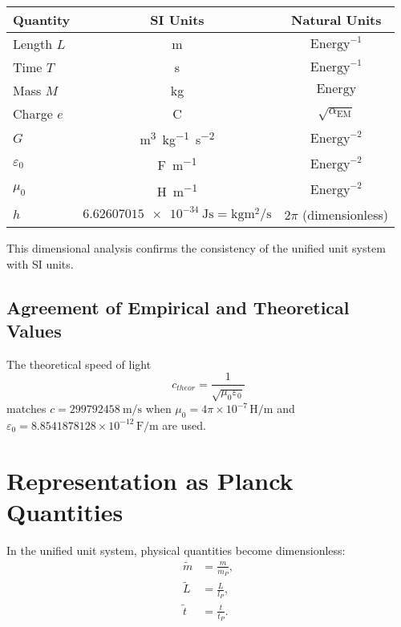 \documentclass[12pt,a4paper]{article}
\newcommand{\alphaEM}{\alpha_{\text{EM}}}
\begin{document}
	\begin{center}
		\begin{tabular}{lcc}
			\toprule
			\textbf{Quantity} & \textbf{SI Units} & \textbf{Natural Units} \\
			\midrule
			Length \(L\) & \si{\meter} & \(\text{Energy}^{-1}\) \\
			Time \(T\) & \si{\second} & \(\text{Energy}^{-1}\) \\
			Mass \(M\) & \si{\kilo\gram} & \(\text{Energy}\) \\
			Charge \(e\) & \si{\coulomb} & \(\sqrt{\alphaEM}\) \\
			\(G\) & \si{\meter^3\kilo\gram^{-1}\second^{-2}} & \(\text{Energy}^{-2}\) \\
			\(\varepsilon_0\) & \si{\farad\per\meter} & \(\text{Energy}^{-2}\) \\
			\(\mu_0\) & \si{\henry\per\meter} & \(\text{Energy}^{-2}\) \\
			\(h\) & \(\SI{6.62607015e-34}{\joule\second} = \si{\kilo\gram \meter\squared\per\second}\) & \(2\pi\) (dimensionless) \\
			\bottomrule
		\end{tabular}
	\end{center}
	
	This dimensional analysis confirms the consistency of the unified unit system with SI units.
	
	\subsection{Agreement of Empirical and Theoretical Values}
	
	The theoretical speed of light
	\begin{equation}
		c_{theor} = \frac{1}{\sqrt{\mu_0 \varepsilon_0}}
	\end{equation}
	matches \(c = \SI{299792458}{\meter\per\second}\) when \(\mu_0 = 4\pi \times 10^{-7} \, \si{\henry\per\meter}\) and \(\varepsilon_0 = 8.8541878128 \times 10^{-12} \, \si{\farad\per\meter}\) are used.
	
	\section{Representation as Planck Quantities}
	
	In the unified unit system, physical quantities become dimensionless:
	\begin{align}
		\tilde{m} &= \frac{m}{m_P}, \\
		\tilde{L} &= \frac{L}{l_P}, \\
		\tilde{t} &= \frac{t}{t_P}.
	\end{align}
	
\end{document}
